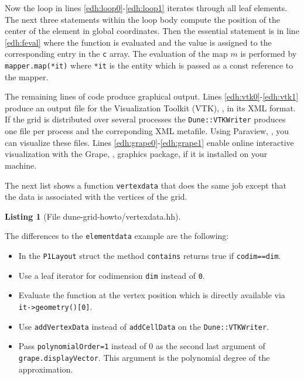 \documentclass[11pt,a4paper,headinclude,footinclude,DIV16,normalheadings]{scrreprt}
\newtheorem{lst}{Listing}
\begin{document}
Now the loop in lines \ref{edh:loop0}-\ref{edh:loop1} iterates through
all leaf elements. The next three statements within the loop body
compute the position of the center of the element in global
coordinates. Then the essential statement is in line \ref{edh:feval}
where the function is evaluated and the value is assigned to the
corresponding entry in the \lstinline!c! array. The evaluation of the
map $m$ is performed by \lstinline!mapper.map(*it)!  where
\lstinline!*it! is the entity which is passed as a const reference to
the mapper.

The remaining lines of code produce graphical output. Lines
\ref{edh:vtk0}-\ref{edh:vtk1} produce an output file for the
Visualization Toolkit (VTK), \cite{VTK}, in its XML format. If the
grid is distributed over several processes the
\lstinline!Dune::VTKWriter! produces one file per process and the
correponding XML metafile. Using Paraview, \cite{Paraview}, you can
visualize these files. Lines \ref{edh:grape0}-\ref{edh:grape1} enable
online interactive visualization with the Grape, \cite{Grape},
graphics package, if it is installed on your machine.

The next list shows a function \lstinline!vertexdata! that does the
same job except that the data is associated with the vertices of the
grid. 

\begin{lst}[File dune-grid-howto/vertexdata.hh] \mbox{}
\nopagebreak

\end{lst}

The differences to the \lstinline!elementdata! example are the
following:
\begin{itemize}
\item In the \lstinline!P1Layout! struct the method
  \lstinline!contains! returns true if \lstinline!codim==dim!.
\item Use a leaf iterator for codimension \lstinline!dim! instead of
  \lstinline!0!.
\item Evaluate the function at the vertex position which is directly
  available via \lstinline!it->geometry()[0]!.
\item Use \lstinline!addVertexData! instead of \lstinline!addCellData!
  on the \lstinline!Dune::VTKWriter!.
\item Pass \lstinline!polynomialOrder=1! instead of 0 as 
the second last argument of \lstinline!grape.displayVector!. This argument is the polynomial
  degree of the approximation.
\end{itemize}
\end{document}
